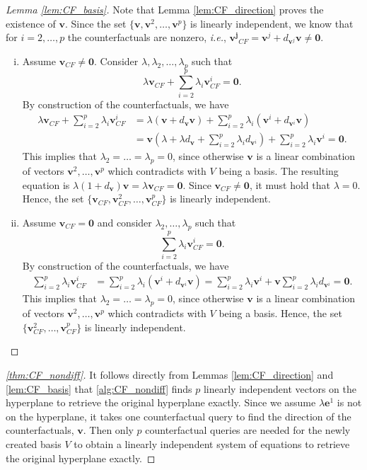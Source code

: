 \documentclass{article}
\begin{document}
{\begin{proof}[Lemma \ref{lem:CF_basis}]
Note that Lemma \ref{lem:CF_direction} proves the existence of $\bm{v}$. Since the set $\{\bm{v}, \bm{v}^{2},\ldots, \bm{v}^{p}\}$ is linearly independent, we know that for $i=2,\ldots,p$ the counterfactuals are nonzero, \textit{i.e.}, $\bm{ \bm{v}^{j}}_{CF} =  \bm{v}^{j}+d_{ \bm{v}^{j}}\bm{v}\neq\bm{0}$.
    \begin{enumerate}[(i)]
        \item Assume $\bm{v}_{CF}\neq\bm{0}$. Consider $\lambda,\lambda_2,\ldots, \lambda_p$ such that
        \[\lambda\bm{v}_{CF}+\sum_{i=2}^p\lambda_i\bm{v}_{CF}^{i}=\bm{0}.\]
        By construction of the counterfactuals, we have
        \begin{align*}
        \lambda\bm{v}_{CF}+\sum_{i=2}^p\lambda_i\bm{v}_{CF}^{i} &=  \lambda\left(\bm{v}+d_{\bm{v}}\bm{v}\right)+\sum_{i=2}^p\lambda_i\left(\bm{v}^{i}+d_{\bm{v}^{i}}\bm{v}\right)\\
        &= \bm{v}\left(\lambda+\lambda d_{\bm{v}}+ \sum_{i=2}^p\lambda_i d_{\bm{v}^{i}}\right) + \sum_{i=2}^p \lambda_i\bm{v}^{i} = \bm{0}.
        \end{align*}
        This implies that $\lambda_2=\ldots=\lambda_p=0$, since otherwise $\bm{v}$ is a linear combination of vectors $\bm{v}^{2},\ldots, \bm{v}^{p}$ which contradicts with $V$ being a basis. The resulting equation is $\lambda(1+d_{\bm{v}})\bm{v}=\lambda\bm{v}_{CF}=\bm{0}$. 
        Since $\bm{v}_{CF}\neq\bm{0}$, it must hold that $\lambda=0$.
        Hence, the set $\{\bm{v}_{CF},\bm{v}_{CF}^{2},\ldots, \bm{v}_{CF}^{p}\}$ is linearly independent.
        \item Assume $\bm{v}_{CF}=\bm{0}$ and consider $\lambda_2,\ldots, \lambda_p$ such that
        \[\sum_{i=2}^p\lambda_i\bm{v}_{CF}^{i}=\bm{0}.\]
        By construction of the counterfactuals, we have
        \begin{align*}
        \sum_{i=2}^p\lambda_i\bm{v}_{CF}^{i} &= \sum_{i=2}^p\lambda_i\left(\bm{v}^{i}+d_{\bm{v}^{i}}\bm{v}\right) 
        = \sum_{i=2}^p \lambda_i\bm{v}^{i} + \bm{v} \sum_{i=2}^p\lambda_i d_{\bm{v}^{i}} = \bm{0}.
        \end{align*}
        This implies that $\lambda_2=\ldots=\lambda_p=0$, since otherwise $\bm{v}$ is a linear combination of vectors $\bm{v}^{2},\ldots, \bm{v}^{p}$ which contradicts with $V$ being a basis.
        Hence, the set $\{\bm{v}_{CF}^{2},\ldots, \bm{v}_{CF}^{p}\}$ is linearly independent.
    \end{enumerate}
\end{proof}
\begin{proof}[\cref{thm:CF_nondiff}]
It follows directly from Lemmas \ref{lem:CF_direction} and \ref{lem:CF_basis} that \cref{alg:CF_nondiff} finds $p$ linearly independent vectors on the hyperplane to retrieve the original hyperplane exactly. Since we assume $\lambda\bm{e}^{1}$ is not on the hyperplane, it takes one counterfactual query to find the direction of the counterfactuals, $\bm{v}$. Then only $p$ counterfactual queries are needed for the newly created basis $V$ to obtain a linearly independent system of equations to retrieve the original hyperplane exactly.
\end{proof}

}
\end{document}
